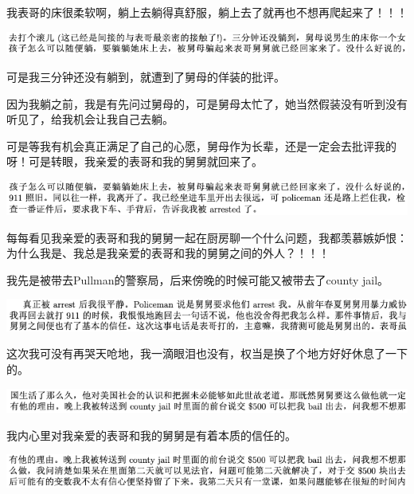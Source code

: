 \documentclass[9pt, b5paper]{article}
\begin{document}
我表哥的床很柔软啊，躺上去躺得真舒服，躺上去了就再也不想再爬起来了！！！

\begin{center}
\includegraphics[width=.9\linewidth]{./pic/backups_plans_20210505_213427.png}
\end{center}

可是我三分钟还没有躺到，就遭到了舅母的佯装的批评。

因为我躺之前，我是有先问过舅母的，可是舅母太忙了，她当然假装没有听到没有听见了，给我机会让我自己去躺。

可是等我有机会真正满足了自己的心愿，舅母作为长辈，还是一定会去批评我的呀！可是转眼，我亲爱的表哥和我的舅舅就回来了。 

\begin{center}
\includegraphics[width=.9\linewidth]{./pic/backups_plans_20210505_214300.png}
\end{center}

每每看见我亲爱的表哥和我的舅舅一起在厨房聊一个什么问题，我都羡慕嫉妒恨：为什么我是、我总是我亲爱的表哥和我的舅舅之间的外人？！！！

我先是被带去Pullman的警察局，后来傍晚的时候可能又被带去了county jail。

\begin{center}
\includegraphics[width=.9\linewidth]{./pic/backups_plans_20210506_084122.png}
\end{center}

这次我可没有再哭天呛地，我一滴眼泪也没有，权当是换了个地方好好休息了一下的。 

\begin{center}
\includegraphics[width=.9\linewidth]{./pic/backups_plans_20210506_084228.png}
\end{center}

我内心里对我亲爱的表哥和我的舅舅是有着本质的信任的。 

\begin{center}
\includegraphics[width=.9\linewidth]{./pic/backups_plans_20210506_084259.png}
\end{center}
\end{document}
